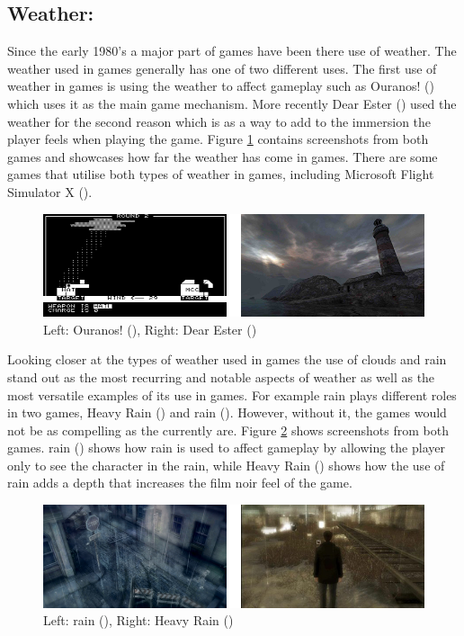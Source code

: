 \subsection{Weather:}
\label{sec:weather}
Since the early 1980's a major part of games have been there use of weather.
The weather used in games generally has one of two different uses.
The first use of weather in games is using the weather to affect gameplay such as Ouranos! (\citeyear{Ouranos80}) which uses it as the main game mechanism.
More recently Dear Ester (\citeyear{DearEsther12}) used the weather for the second reason which is as a way to add to the immersion the player feels when playing the game.
Figure \ref{fig:de_o} contains screenshots from both games and showcases how far the weather has come in games.
There are some games that utilise both types of weather in games, including Microsoft Flight Simulator X (\citeyear{MFS03}). 


\begin{figure}[ht!]
	\centering
	\includegraphics[width=\textwidth]{images/dear_esther.PNG}
	\caption{Left: Ouranos! (\citeyear{Ouranos80}), Right: Dear Ester (\citeyear{DearEsther12})}
	\label{fig:de_o}
\end{figure}


Looking closer at the types of weather used in games the use of clouds and rain stand out as the most recurring and notable aspects of weather as well as the most versatile examples of its use in games.
For example rain plays different roles in two games, Heavy Rain (\citeyear{HeavyRain10}) and rain (\citeyear{rain13}).
However, without it, the games would not be as compelling as the currently are.
Figure \ref{fig:rain_heavy_rain} shows screenshots from both games.
rain (\citeyear{rain13}) shows how rain is used to affect gameplay by allowing the player only to see the character in the rain, while Heavy Rain (\citeyear{HeavyRain10}) shows how the use of rain adds a depth that increases the film noir feel of the game.


\begin{figure}[ht!]
	\centering
	\includegraphics[width=\textwidth]{images/rain_heavy_rain.PNG}
	\caption{Left: rain (\citeyear{rain13}), Right: Heavy Rain (\citeyear{HeavyRain10})}
	\label{fig:rain_heavy_rain}
\end{figure}


